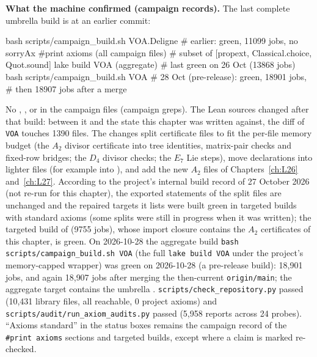 \textbf{What the machine confirmed (campaign records).} The last complete umbrella build is at an earlier commit:
\begin{plaincode}
bash scripts/campaign_build.sh VOA.Deligne     # earlier: green, 11099 jobs, no sorryAx
#print axioms (all campaign files)             # subset of [propext, Classical.choice, Quot.sound]
lake build VOA (aggregate)                      # last green on 26 Oct (13868 jobs)
bash scripts/campaign_build.sh VOA              # 28 Oct (pre-release): green, 18901 jobs,
                                                #   then 18907 jobs after a merge
\end{plaincode}
No , ,  or  in the campaign files (campaign greps). The
Lean sources changed after that build: between it and the state this chapter was written against, the diff of \texttt{VOA} touches 1390 files. The
changes split certificate files to fit the per-file memory budget (the $A_2$ divisor certificate
 into tree identities, matrix-pair checks and fixed-row bridges; the $D_4$ divisor checks;
the $E_7$ Lie steps), move declarations into lighter files (for example  into
), and add the new $A_2$ files of Chapters~\ref{ch:L26}
and~\ref{ch:L27}. According to the project's internal build record of 27 October 2026 (not re-run for this chapter), the exported statements of the split
files are unchanged and the repaired targets it lists were built green in targeted builds with standard axioms (some
splits were still in progress when it was written); the targeted
build of  (9755 jobs), whose import closure contains the $A_2$ certificates of
this chapter, is green. On 2026-10-28 the aggregate build \texttt{bash scripts/campaign\_build.sh VOA} (the full \texttt{lake build VOA} under the project's memory-capped wrapper) was green on 2026-10-28 (a pre-release build): 18{,}901 jobs, and again 18{,}907 jobs after merging the then-current \texttt{origin/main}; the aggregate target contains the umbrella . \texttt{scripts/check\_repository.py} passed (10{,}431 library files, all reachable, 0 project axioms) and \texttt{scripts/audit/run\_axiom\_audits.py} passed (5{,}958 reports across 24 probes). ``Axioms standard'' in the status boxes remains the campaign record of the \texttt{\#print axioms} sections and targeted
builds, except where a claim is marked re-checked.

